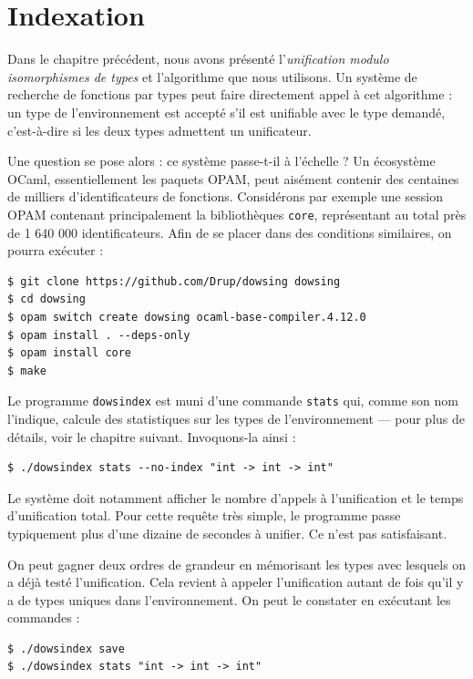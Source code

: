 \documentclass[a4paper]{report}
\theoremstyle{definition}
\newcommand{\dowsindex}{\texttt{dowsindex}\xspace}
\begin{document}
\chapter {Indexation}

Dans le chapitre précédent, nous avons présenté l'\emph{unification modulo isomorphismes de types} et l'algorithme que nous utilisons. Un système de recherche de fonctions par types peut faire directement appel à cet algorithme : un type de l'environnement est accepté s'il est unifiable avec le type demandé, c'est-à-dire si les deux types admettent un unificateur.

Une question se pose alors : ce système passe-t-il à l'échelle ? Un écosystème OCaml, essentiellement les paquets OPAM, peut aisément contenir des centaines de milliers d'identificateurs de fonctions. Considérons par exemple une session OPAM contenant principalement la bibliothèques \texttt{core}, représentant au total près de 1 640 000 identificateurs. Afin de se placer dans des conditions similaires, on pourra exécuter :

\begin{verbatim}
$ git clone https://github.com/Drup/dowsing dowsing
$ cd dowsing
$ opam switch create dowsing ocaml-base-compiler.4.12.0
$ opam install . --deps-only
$ opam install core
$ make
\end{verbatim}

Le programme \dowsindex est muni d'une commande \texttt{stats} qui, comme son nom l'indique, calcule des statistiques sur les types de l'environnement — pour plus de détails, voir le chapitre suivant. Invoquons-la ainsi :

\begin{verbatim}
$ ./dowsindex stats --no-index "int -> int -> int"
\end{verbatim}

Le système doit notamment afficher le nombre d'appels à l'unification et le temps d'unification total. Pour cette requête très simple, le programme passe typiquement plus d'une dizaine de secondes à unifier. Ce n'est pas satisfaisant.

On peut gagner deux ordres de grandeur en mémorisant les types avec lesquels on a déjà testé l'unification. Cela revient à appeler l'unification autant de fois qu'il y a de types uniques dans l'environnement. On peut le constater en exécutant les commandes :

\begin{verbatim}
$ ./dowsindex save
$ ./dowsindex stats "int -> int -> int"
\end{verbatim}
\end{document}
